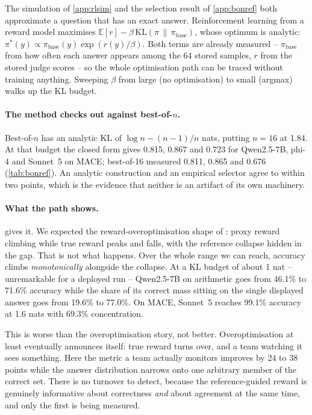 The simulation of \cref{app:rlsim} and the selection result of \cref{app:bonref} both approximate a
question that has an exact answer. Reinforcement learning from a reward model maximises
$\mathbb{E}[r] - \beta\,\mathrm{KL}(\pi \,\|\, \pi_{\text{base}})$, whose optimum is analytic:
$\pi^{*}(y) \propto \pi_{\text{base}}(y)\exp(r(y)/\beta)$. Both terms are already measured --
$\pi_{\text{base}}$ from how often each answer appears among the 64 stored samples, $r$ from the
stored judge scores -- so the whole optimisation path can be traced without training anything.
Sweeping $\beta$ from large (no optimisation) to small (argmax) walks up the KL budget.\ph{}

\paragraph{The method checks out against best-of-$n$.} Best-of-$n$ has an analytic KL of
$\log n - (n-1)/n$ nats, putting $n=16$ at 1.84. At that budget the closed form gives 0.815, 0.867
and 0.723 for Qwen2.5-7B, phi-4 and Sonnet~5 on \textsc{MACE}; best-of-16 measured 0.811, 0.865 and
0.676 (\cref{tab:bonref}). An analytic construction and an empirical selector agree to within two
points, which is the evidence that neither is an artifact of its own machinery.

\paragraph{What the path shows.}  gives it. We expected the reward-overoptimisation
shape of \citet{gao2022scaling}: proxy reward climbing while true reward peaks and falls, with the
reference collapse hidden in the gap. That is not what happens. Over the whole range we can reach,
accuracy climbs \emph{monotonically} alongside the collapse. At a KL budget of about 1 nat --
unremarkable for a deployed run -- Qwen2.5-7B on arithmetic goes from 46.1\% to 71.6\% accuracy
while the share of its correct mass sitting on the single displayed answer goes from 19.6\% to
77.0\%. On \textsc{MACE}, Sonnet~5 reaches 99.1\% accuracy at 1.6 nats with 69.3\% concentration.

This is worse than the overoptimisation story, not better. Overoptimisation at least eventually
announces itself: true reward turns over, and a team watching it sees something. Here the metric a
team actually monitors improves by 24 to 38 points while the answer distribution narrows onto one
arbitrary member of the correct set. There is no turnover to detect, because the reference-guided
reward is genuinely informative about correctness \emph{and} about agreement at the same time, and
only the first is being measured.

